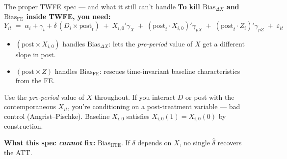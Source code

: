 \documentclass[aspectratio=169,11pt]{beamer}
\begin{document}



\begin{frame}{The proper TWFE spec --- and what it still can't handle}
\footnotesize
\textbf{To kill $\text{Bias}_{\Delta X}$ and $\text{Bias}_{\text{FE}}$ inside TWFE, you need:}
\[
Y_{it} \;=\; \alpha_i + \gamma_t + \delta\,(D_i{\times}\text{post}_t) \;+\; X_{i,0}'\gamma_X \;+\; (\text{post}_t \cdot X_{i,0})'\gamma_{pX} \;+\; (\text{post}_t \cdot Z_i)'\gamma_{pZ} \;+\; \varepsilon_{it}
\]

\vspace{0.4em}
\begin{itemize}\setlength\itemsep{2pt}
  \item $(\text{post}\times X_{i,0})$ handles $\text{Bias}_{\Delta X}$: lets the \textit{pre-period} value of $X$ get a different slope in post.
  \item $(\text{post}\times Z)$ handles $\text{Bias}_{\text{FE}}$: rescues time-invariant baseline characteristics from the FE.
\end{itemize}

\vspace{0.4em}
 \;Use the \textit{pre-period} value of $X$ throughout. \;If you interact $D$ or post with the contemporaneous $X_{it}$, you're conditioning on a post-treatment variable --- bad control (Angrist--Pischke). \;Baseline $X_{i,0}$ satisfies $X_{i,0}(1) = X_{i,0}(0)$ by construction.

\vspace{0.4em}
\textbf{What this spec \textit{cannot} fix:} \;$\text{Bias}_{\text{HTE}}$. \;If $\delta$ depends on $X$, no single $\hat\delta$ recovers the ATT.
\end{frame}
\end{document}
